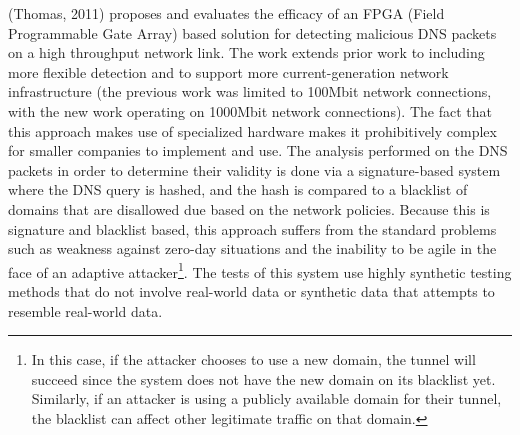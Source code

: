 \documentclass[12pt]{report}
\theoremstyle{remark}
\theoremstyle{definition}
\theoremstyle{definition}
\theoremstyle{definition}
\begin{document}
(Thomas, 2011)\cite{Thomas2011} proposes and evaluates the efficacy of an FPGA
(Field Programmable Gate Array) based solution for detecting malicious DNS
packets on a high throughput network link. The work extends prior work to
including more flexible detection and to support more current-generation network
infrastructure (the previous work was limited to 100Mbit network connections,
with the new work operating on 1000Mbit network connections). The fact that this
approach makes use of specialized hardware makes it prohibitively complex for
smaller companies to implement and use. The analysis performed on the DNS
packets in order to determine their validity is done via a signature-based system
where the DNS query is hashed, and the hash is compared to a blacklist of
domains that are disallowed due based on the network policies. Because this is
signature and blacklist based, this approach suffers from the standard problems
such as weakness against zero-day situations and the inability to be agile in
the face of an adaptive attacker\footnote{In this case, if the attacker chooses
to use a new domain, the tunnel will succeed since the system does not have the
new domain on its blacklist yet. Similarly, if an attacker is using a publicly
available domain for their tunnel, the blacklist can affect other legitimate
traffic on that domain.}. The tests of this system use highly synthetic testing
methods that do not involve real-world data or synthetic data that attempts to
resemble real-world data.
\end{document}
